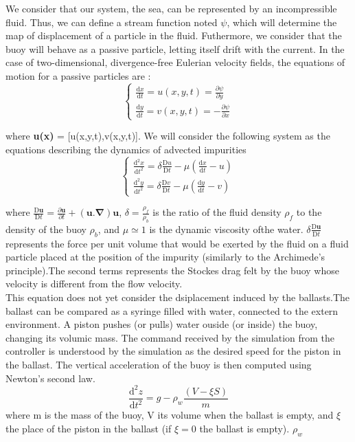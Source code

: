 \documentclass[a4paper]{report}
\begin{document}
We consider that our system, the sea, can be represented by an incompressible fluid. Thus, we can define a stream function noted $\psi$, which will determine the map of displacement of a particle in the fluid.
Futhermore, we consider that the buoy will behave as a passive particle, letting itself drift with the current.
In the case of two-dimensional, divergence-free Eulerian velocity fields, the equations of motion for a passive particles are : \begin{equation}
\left\{\begin{matrix}
\frac{\mathrm{d} x}{\mathrm{d} t}= u(x,y,t)=\frac{\partial \psi }{\partial y}\\ 
\frac{\mathrm{d} y}{\mathrm{d} t}= v(x,y,t)=-\frac{\partial \psi }{\partial x}
\end{matrix}\right.
\end{equation}

where \textbf{u(x)} = [u(x,y,t),v(x,y,t)].
We will consider the following system as the equations describing the dynamics of advected impurities
\begin{equation}
\left\{\begin{matrix}
\frac{\mathrm{d^2} x}{\mathrm{d} t^2}= \delta \frac{\mathrm{D} u}{\mathrm{D} t} -\mu (\frac{\mathrm{d} x }{\mathrm{d} t}-u)\\ 
\frac{\mathrm{d^2} y}{\mathrm{d} t^2}= \delta \frac{\mathrm{D} v}{\mathrm{D} t} -\mu (\frac{\mathrm{d} y}{\mathrm{d} t}-v)
\end{matrix}\right.
\end{equation}

where 
$
\frac{\mathrm{D} \mathbf{u}}{\mathrm{D} t} = \frac{\partial \mathbf{u} }{\partial t}+\mathbf{(u. \nabla )u}
$,
$\delta = \frac{\rho_f}{\rho_b}$
is the ratio of the fluid density $\rho_f$ to the density of the buoy $\rho_b$, and
$\mu \simeq 1$ is the dynamic viscosity ofthe water.
$\delta \frac{\mathrm{D} \mathbf{u}}{\mathrm{D} t}$ represents the force per unit volume that would be exerted by the fluid on a fluid particle placed at the position of the impurity (similarly to the Archimede's principle).The second terms represents the Stockes drag felt by the buoy whose velocity is different from the flow velocity.\\

This equation does not yet consider the dsiplacement induced by the ballasts.The ballast can be compared as a syringe filled with water, connected to the extern environment. A piston pushes (or pulls) water ouside (or inside) the buoy, changing its volumic mass.
The command received by the simulation from the controller is understood by the simulation as the desired speed for the piston in the ballast.
The vertical acceleration of the buoy is then computed using Newton's second law.\\
\begin{equation}
\frac{\mathrm{d^2} z}{\mathrm{d} t^2}= g-\rho_w \frac {\left ( V-\xi S \right )}{m}
\end{equation}
where m is the mass of the buoy, V its volume when the ballast is empty, and $\xi$ the place of the piston in the ballast (if $\xi = 0$ the ballast is empty). $\rho_w$ 
\end{document}
